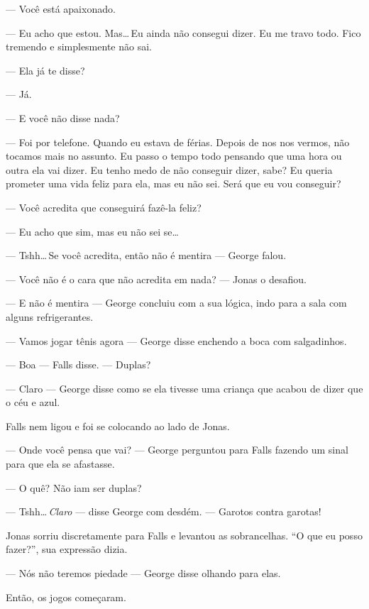 --- Você está apaixonado.

--- Eu acho que estou. Mas\ldots\,Eu ainda não consegui dizer. Eu me travo todo. Fico tremendo e simplesmente não sai.

--- Ela já te disse?

\enlargethispage{\baselineskip}

--- Já.

--- E você não disse nada?

--- Foi por telefone. Quando eu estava de férias. Depois de nos nos vermos, não tocamos mais no assunto. Eu passo o tempo todo pensando que uma hora ou outra ela vai dizer. Eu tenho medo de não conseguir dizer, sabe? Eu queria prometer uma vida feliz para ela, mas eu não sei. Será que eu vou conseguir?

--- Você acredita que conseguirá fazê-la feliz?

--- Eu acho que sim, mas eu não sei se\ldots

--- Tshh\ldots\,Se você acredita, então não é mentira --- George falou.

--- Você não é o cara que não acredita em nada? --- Jonas o desafiou.

--- E não é mentira --- George concluiu com a sua lógica, indo para a sala com alguns refrigerantes.

--- Vamos jogar tênis agora --- George disse\mudanca{,} enchendo a boca com salgadinhos.

--- Boa --- Falls disse. --- Duplas?

--- Claro --- George disse\mudanca{,} como se ela tivesse uma criança que acabou de dizer que o céu e azul.

Falls nem ligou e foi se colocando ao lado de Jonas.

--- Onde você pensa que vai? --- George perguntou para Falls\mudanca{,} fazendo um sinal para que ela se afastasse.

--- O quê? Não iam ser duplas?

--- Tshh\ldots\,\emph{Claro} --- disse George com desdém. --- Garotos contra garotas!

Jonas sorriu discretamente para Falls e levantou as sobrancelhas. ``O que eu posso fazer?'', sua expressão dizia.

\enlargethispage{\baselineskip}

--- Nós não teremos piedade --- George disse olhando para elas.

Então, os jogos começaram.
